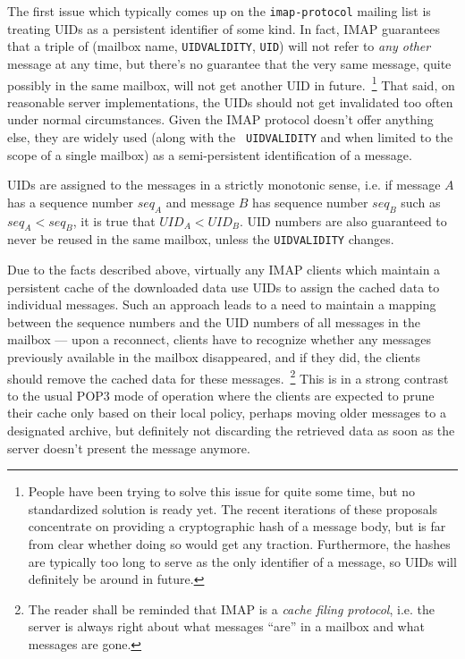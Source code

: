 \documentclass[trojita]{subfiles}
\begin{document}
The first issue which typically comes up on the {\tt imap-protocol} mailing list is treating UIDs as a persistent
identifier of some kind.  In fact, IMAP guarantees that a triple of (mailbox name, {\tt UIDVALIDITY}, {\tt UID}) will
not refer to {\em any other} message at any time, but there's no guarantee that the very same message, quite possibly in
the same mailbox, will not get another UID in future.~\footnote{People have been trying to solve this issue for quite
some time, but no standardized solution is ready yet.  The recent iterations of these proposals concentrate on providing
a cryptographic hash of a message body, but is far from clear whether doing so would get any traction.  Furthermore, the
hashes are typically too long to serve as the only identifier of a message, so UIDs will definitely be around in
future.}  That said, on reasonable server implementations, the UIDs should not get invalidated too often under normal
circumstances.  Given the IMAP protocol doesn't offer anything else, they are widely used (along with the {\tt
UIDVALIDITY} and when limited to the scope of a single mailbox) as a semi-persistent identification of a message.

UIDs are assigned to the messages in a strictly monotonic sense, i.e. if message $A$ has a sequence number $seq_A$ and
message $B$ has sequence number $seq_B$ such as $seq_A < seq_B$, it is true that $UID_A < UID_B$.  UID numbers are also
guaranteed to never be reused in the same mailbox, unless the {\tt UIDVALIDITY} changes.

Due to the facts described above, virtually any IMAP clients which maintain a persistent cache of the downloaded data
use UIDs to assign the cached data to individual messages.  Such an approach leads to a need to maintain a mapping
between the sequence numbers and the UID numbers of all messages in the mailbox --- upon a reconnect, clients have to
recognize whether any messages previously available in the mailbox disappeared, and if they did, the clients should
remove the cached data for these messages.~\footnote{The reader shall be reminded that IMAP is a {\em cache filing
protocol}, i.e. the server is always right about what messages ``are'' in a mailbox and what messages are gone.}  This
is in a strong contrast to the usual POP3 mode of operation where the clients are expected to prune their cache only
based on their local policy, perhaps moving older messages to a designated archive, but definitely not discarding the
retrieved data as soon as the server doesn't present the message anymore.
\end{document}
